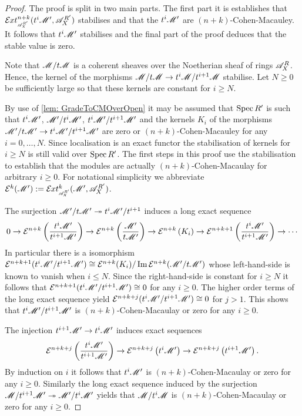 \begin{proof}
  The proof is split in two main parts. The first part it is establishes that $\Ex{\A_X^{R'}}{n+k}(t^i\M',\ab\A_X^{R'})$ stabilises and that the $t^i\mathscr{M}'$ are $(n+k)$-Cohen-Macauley. It follows that $t^i\mathscr{M}'$ stabilises and the final part of the proof deduces that the stable value is zero.

  Note that $\mathscr{M}/t\mathscr{M}$ is a coherent sheaves over the Noetherian sheaf of rings $\mathscr{A}_X^R$.
  Hence, the kernel of the morphisms $\mathscr{M}/t\mathscr{M} \to t^i\mathscr{M} / t^{i+1}\mathscr{M}$ stabilise.
  Let $N\geq 0$ be sufficiently large so that these kernels are constant for $i\geq N$.

  By use of \cref{lem: GradeToCMOverOpen} it may be assumed that $\operatorname{Spec} R'$ is such that $t^i\mathscr{M}'$, $\mathscr{M}'/t^{i}\mathscr{M}'$, $t^i\mathscr{M}'/t^{i+1}\mathscr{M}'$ and the kernels $K_i$ of the morphisms $\mathscr{M}'/t\mathscr{M}' \to t^i \mathscr{M}'/ t^{i+1} \mathscr{M}'$ are zero or $(n+k)$-Cohen-Macauley for any $i=0,\ldots,N$.
  Since localisation is an exact functor the stabilisation of kernels for $i\geq N$ is still valid over $\operatorname{Spec} R'$.
  The first steps in this proof use the stabilisation to establish that the modules are actually $(n+k)$-Cohen-Macaulay for arbitrary $i\geq 0$. For notational simplicity we abbreviate $\E^{k}(\M') :=\Ex{\A_X^{R'}}{k}(\M',\A_X^{R'})$.

  The surjection $\mathscr{M}'/t\mathscr{M}' \twoheadrightarrow t^i \mathscr{M}'/t^{i+1}$ induces a long exact sequence
  $$0 \to \mathcal{E}^{n+k}\left(\frac{t^i\mathscr{M}'}{ t^{i+1}\mathscr{M}'}\right) \to  \mathcal{E}^{n+k}\left(\frac{\mathscr{M}'}{t\mathscr{M}'}\right) \to \mathcal{E}^{n+k}\left(K_i\right) \to \mathcal{E}^{n+k+1}\left(\frac{t^i\mathscr{M}'}{ t^{i+1}\mathscr{M}'}\right)\to \cdots $$
  In particular there is a isomorphism $\mathcal{E}^{n+k+1}(t^i\mathscr{M}'/t^{i+1}\mathscr{M}') \cong \mathcal{E}^{n+k}(K_i)\allowbreak/\operatorname{Im} \mathcal{E}^{n+k}(\mathscr{M}'\allowbreak /t\mathscr{M}')$ whose left-hand-side is known to vanish when $i\leq N$.
  Since the right-hand-side is constant for $i\geq N$ it follows that $\mathcal{E}^{n+k+1}(t^i\mathscr{M}'/t^{i+1}\mathscr{M}')\cong 0$ for any $i\geq 0$.
  The higher order terms of the long exact sequence yield $\mathcal{E}^{n+k+j}(t^i\mathscr{M}'/ t^{i+1}\mathscr{M}') \cong 0$ for $j>1$.
  This shows that $t^i \mathscr{M}'/t^{i+1}\mathscr{M}'$ is $(n+k)$-Cohen-Macaulay or zero for any $i\geq 0$.


  The injection $t^{i+1} \mathscr{M}'\to t^{i}\mathscr{M}'$ induces exact sequences
  $$\mathcal{E}^{n+k+j}\left(\frac{t^i\mathscr{M}'}{ t^{i+1}\mathscr{M}'}\right) \to  \mathcal{E}^{n+k+j}\left(t^{i}\mathscr{M}'\right) \to \mathcal{E}^{n+k +j}\left(t^{i+1} \mathscr{M}'\right).$$
  By induction on $i$ it follows that $t^i\mathscr{M}'$ is $(n+k)$-Cohen-Macaulay or zero for any $i\geq 0$.
  Similarly the long exact sequence induced by the surjection $\mathscr{M}/t^{i+1}\mathscr{M}' \twoheadrightarrow \mathscr{M}'/t^{i}\mathscr{M}'$ yields that $\mathscr{M}/t^{i}\mathscr{M}$ is $(n+k)$-Cohen-Macaulay or zero for any $i\geq 0$.



\end{proof}

